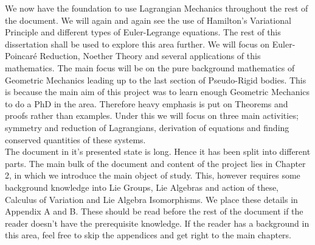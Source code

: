 \noindent
We now have the foundation to use Lagrangian Mechanics throughout the rest of the document. We will again and again see the use of Hamilton's Variational Principle and different types of Euler-Legrange equations. The rest of this dissertation shall be used to explore this area further. We will focus on Euler-Poincar\'e Reduction, Noether Theory and several applications of this mathematics. The main focus will be on the pure background mathematics of Geometric Mechanics leading up to the last section of Pseudo-Rigid bodies. This is because the main aim of this project was to learn enough Geometric Mechanics to do a PhD in the area. Therefore heavy emphasis is put on Theorems and proofs rather than examples. Under this we will focus on three main activities; symmetry and reduction of Lagrangians, derivation of equations and finding conserved quantities of these systems.\\

\noindent
The document in it's presented state is long. Hence it has been split into different parts. The main bulk of the document and content of the project lies in Chapter 2, in which we introduce the main object of study. This, however requires some background knowledge into Lie Groups, Lie Algebras and action of these,  Calculus of Variation and Lie Algebra Isomorphisms. We place these details in Appendix A and B. These should be read before the rest of the document if the reader doesn't have the prerequisite knowledge. If the reader has a background in this area, feel free to skip the appendices and get right to the main chapters. 

